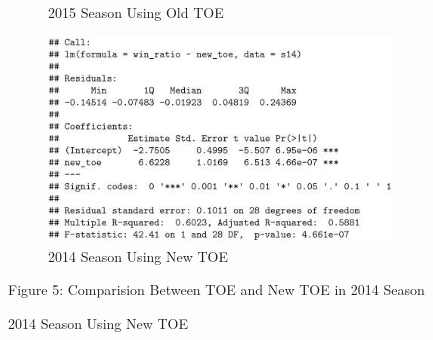 \documentclass[11pt]{article}
\begin{document}
\begin{figure}[h!]
\begin{subfigure}[b]{0.42\linewidth}
    \caption{2015 Season Using Old TOE}
  \end{subfigure}
  \begin{subfigure}[b]{0.42\linewidth}
    \includegraphics[width=\linewidth]{14newsummary.jpg}
    \caption{2014 Season Using New TOE}
  \end{subfigure}
\bigskip

Figure 5: Comparision Between TOE and New TOE in 2014 Season

\end{figure}
\end{document}
